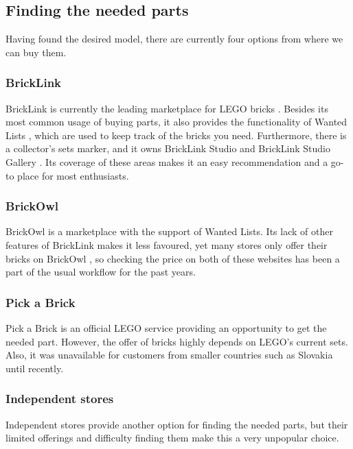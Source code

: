 \subsection{Finding the needed parts}

Having found the desired model, there are currently four options from where we can buy them.

\subsubsection{BrickLink}
\label{BrickLink}

BrickLink is currently the leading marketplace for LEGO bricks \cite{BrickLinkAbout}. Besides its most common usage of buying parts, it also provides the functionality of Wanted Lists , which are used to keep track of the bricks you need. Furthermore, there is a collector's sets marker, and it owns BrickLink Studio and BrickLink Studio Gallery . Its coverage of these areas makes it an easy recommendation and a go-to place for most enthusiasts.

\subsubsection{BrickOwl}
\label{BrickOwl}

BrickOwl is a marketplace with the support of Wanted Lists. Its lack of other features of BrickLink makes it less favoured, yet many stores only offer their bricks on BrickOwl \cite{BrickOwlStores}, so checking the price on both of these websites has been a part of the usual workflow for the past years.

\subsubsection{Pick a Brick}
\label{Pick a Brick}

Pick a Brick is an official LEGO service providing an opportunity to get the needed part. However, the offer of bricks highly depends on LEGO's current sets. Also, it was unavailable for customers from smaller countries such as Slovakia until recently.

\subsubsection{Independent stores}

Independent stores provide another option for finding the needed parts, but their limited offerings and difficulty finding them make this a very unpopular choice.

